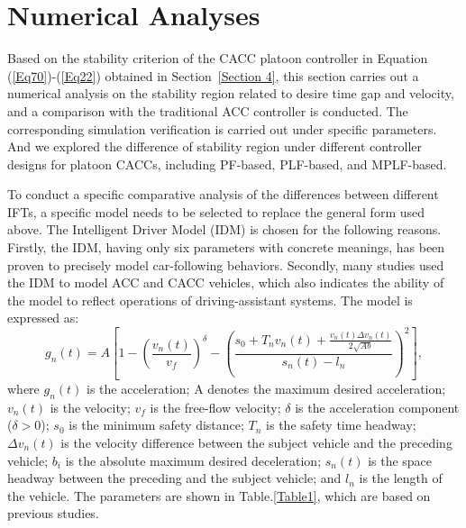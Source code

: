 \documentclass[journal]{IEEEtran}
\begin{document}
\section{Numerical Analyses}
\label{Section 5}
Based on the stability criterion of the CACC platoon controller in Equation (\ref{Eq70})-(\ref{Eq22}) obtained in Section~\ref{Section 4}, this section carries out a numerical analysis on the stability region related to desire time gap and velocity, and a comparison with the traditional ACC controller is conducted. The corresponding simulation verification is carried out under specific parameters. And we explored the difference of stability region under different controller designs for platoon CACCs, including PF-based, PLF-based, and MPLF-based.


To conduct a specific comparative analysis of the differences between different IFTs, a specific model needs to be selected to replace the general form used above. The Intelligent Driver Model (IDM) is chosen for the following reasons. Firstly, the IDM, having only six parameters with concrete meanings, has been proven to precisely model car-following behaviors. Secondly, many studies used the IDM to model ACC and CACC vehicles\citep{chang2020analysis}\citep{li2017evaluation}, which also indicates the ability of the model to reflect operations of driving-assistant systems. The model is expressed as:
\begin{equation}
g_{n}(t)=A\left[1-\left(\frac{v_{n}(t)}{v_{f}}\right)^{\delta}-\left(\frac{s_{0}+T_{n} v_{n}(t)+\frac{v_{n}(t) \Delta v_{n}(t)}{2 \sqrt{A b}}}{s_{n}(t)-l_{n}}\right)^{2}\right],
\label{Eq23}
\end{equation}
where $g_n (t)$ is the acceleration; A denotes the maximum desired acceleration; $v_n (t)$ is the velocity; $v_f$ is the free-flow velocity; $\delta$ is the acceleration component ($\delta>0$); $s_0$ is the minimum safety distance; $T_n$ is the safety time headway; $\Delta v_n (t)$ is the velocity difference between the subject vehicle and the preceding vehicle; $b_i$ is the absolute maximum desired deceleration; $s_n (t)$ is the space headway between the preceding and the subject vehicle; and $l_n$ is the length of the vehicle. The parameters are shown in Table.\ref{Table1},\citep{kesting2008adaptive}\citep{kesting2007jam} which are based on previous studies.

\begin{table}
\centering
\setlength{\abovecaptionskip}{0pt}
\setlength{\belowcaptionskip}{10pt}%
\caption{Parameters chosen for IDM.}
\label{Table1}
\end{table}
\end{document}
